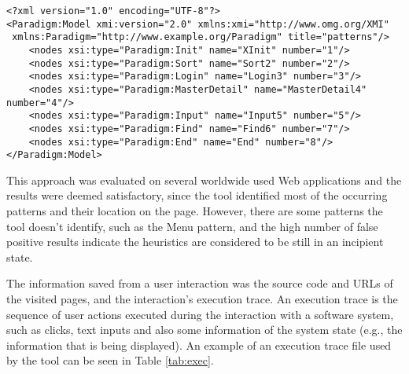 \begin{lstlisting}
<?xml version="1.0" encoding="UTF-8"?>
<Paradigm:Model xmi:version="2.0" xmlns:xmi="http://www.omg.org/XMI"
 xmlns:Paradigm="http://www.example.org/Paradigm" title="patterns"/>
	<nodes xsi:type="Paradigm:Init" name="XInit" number="1"/>
	<nodes xsi:type="Paradigm:Sort" name="Sort2" number="2"/>
    <nodes xsi:type="Paradigm:Login" name="Login3" number="3"/>
    <nodes xsi:type="Paradigm:MasterDetail" name="MasterDetail4" number="4"/>
    <nodes xsi:type="Paradigm:Input" name="Input5" number="5"/>
    <nodes xsi:type="Paradigm:Find" name="Find6" number="7"/>
	<nodes xsi:type="Paradigm:End" name="End" number="8"/>
</Paradigm:Model>
\end{lstlisting}

This approach was evaluated on several worldwide used Web applications and the results were deemed satisfactory, since the tool identified most of the occurring patterns and their location on the page. However, there are some patterns the tool doesn't identify, such as the Menu pattern, and the high number of false positive results indicate the heuristics are considered to be still in an incipient state.

The information saved from a user interaction was the source code and URLs of the visited pages, and the interaction's execution trace. An execution trace is the sequence of user actions executed during the interaction with a software system, such as clicks, text inputs and also some information of the system state (e.g., the information that is being displayed). An example of an execution trace file used by the tool can be seen in Table \ref{tab:exec}.\\

